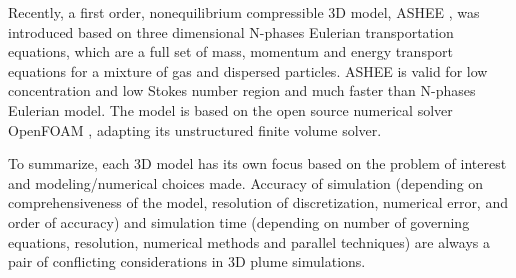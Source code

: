 \documentclass[journal abbreviation, manuscript]{copernicus}
\begin{document}
Recently, a first order, nonequilibrium compressible 3D model, ASHEE \citep{cerminara2016ashee}, was introduced based on three dimensional N-phases Eulerian transportation equations, which are a full set of mass, momentum and energy transport equations for a mixture of gas and dispersed particles. ASHEE is valid for low concentration and low Stokes number region and much faster than N-phases Eulerian model. The model is based on the open source numerical solver OpenFOAM \citep{weller1998tensorial}, adapting its unstructured finite volume solver.

To summarize, each 3D model has its own focus based on the problem of interest and modeling/numerical choices made.
 Accuracy of simulation (depending on comprehensiveness of the model, resolution of discretization, numerical error, and order of accuracy) and simulation time (depending on number of governing equations, resolution, numerical methods and parallel techniques) are always a pair of conflicting considerations in 3D plume simulations.\\
\end{document}
